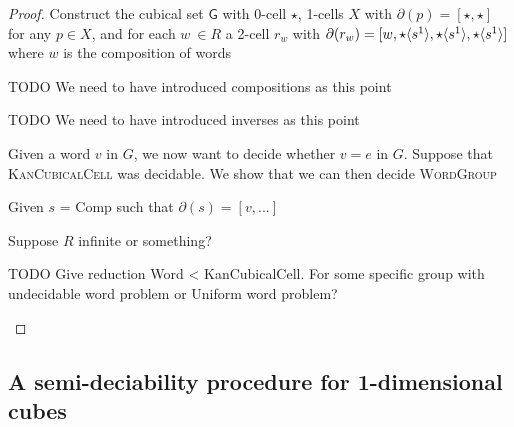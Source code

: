 \documentclass{llncs}
\newcommand{\todo}[1]{
  \begin{tcolorbox}
    TODO {#1} 
  \end{tcolorbox}
}
\newcommand{\myproblem}[1]{\textsc{{#1}}}
\newcommand{\mlist}[1]{[ {#1} ]}
\newcommand{\smap}[1]{s^{{#1}}}
\newcommand{\dmap}[2]{d^{({#1} , {#2})}}
\newcommand{\cont}[2]{\ensuremath{ \ifthenelse{\equal{#2}{}}{#1}{{#1}\langle{#2}\rangle}} }
\newcommand{\cset}[1]{\ensuremath{\mathsf{{#1}}}}
\newcommand{\boundary}[1]{\partial({#1})}
\begin{document}
\begin{proposition}
\begin{theorem}
\begin{proof}
    Construct the cubical set \cset{G} with 0-cell $\star$, 1-cells $X$ with
    $\boundary{p} = \mlist{\star , \star}$ for any $p \in X$, and for each $w \
    \in R$ a 2-cell $r_w$ with $\boundary{r_w} = \mlist{ w , \cont{\star}{\smap{1}} ,
      \cont{\star}{\smap{1}} , \cont{\star}{\smap{1}}}$ where $w$ is the
    composition of words

    \todo{We need to have introduced compositions as this point}
    \todo{We need to have introduced inverses as this point}

    Given a word $v$ in $G$, we now want to decide whether $v = e$ in $G$.
    Suppose that \myproblem{KanCubicalCell} was decidable. We show that we can
    then decide \myproblem{WordGroup}

    Given $s$ = Comp such that $\boundary{s} = \mlist{ v , ... }$
    
    
    Suppose $R$ infinite or something?




    \todo{Give reduction Word < KanCubicalCell. For some specific group with
      undecidable word problem or Uniform word problem? }
\end{proof}
\end{theorem}


\subsection{A semi-deciability procedure for 1-dimensional cubes}


\end{proposition}
\end{document}
